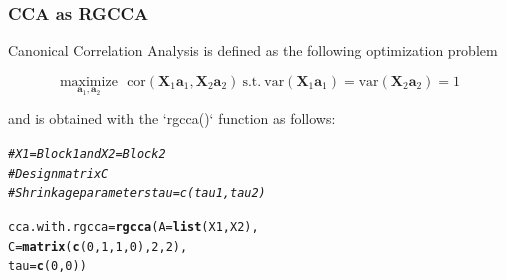 \documentclass[10pt,xcolor=dvipsnames]{beamer}\usepackage[]{graphicx}\usepackage[]{color}
\makeatletter
\newcommand{\hlnum}[1]{\textcolor[rgb]{0.686,0.059,0.569}{#1}}%
\newcommand{\hlcom}[1]{\textcolor[rgb]{0.678,0.584,0.686}{\textit{#1}}}%
\newcommand{\hlstd}[1]{\textcolor[rgb]{0.345,0.345,0.345}{#1}}%
\newcommand{\hlkwb}[1]{\textcolor[rgb]{0.69,0.353,0.396}{#1}}%
\newcommand{\hlkwc}[1]{\textcolor[rgb]{0.333,0.667,0.333}{#1}}%
\newcommand{\hlkwd}[1]{\textcolor[rgb]{0.737,0.353,0.396}{\textbf{#1}}}%
\newenvironment{kframe}{%
 \def\at@end@of@kframe{}%
 \ifinner\ifhmode%
  \def\at@end@of@kframe{\end{minipage}}%
  \begin{minipage}{\columnwidth}%
 \fi\fi%
 \def\FrameCommand##1{\hskip\@totalleftmargin \hskip-\fboxsep
 \colorbox{shadecolor}{##1}\hskip-\fboxsep
     \hskip-\linewidth \hskip-\@totalleftmargin \hskip\columnwidth}%
 \MakeFramed {\advance\hsize-\width
   \@totalleftmargin\z@ \linewidth\hsize
   \@setminipage}}%
 {\par\unskip\endMakeFramed%
 \at@end@of@kframe}
\newenvironment{knitrout}{}{} %
\newcommand{\X}{\mathbf{X}}
\newcommand{\ma}[1]{\ensuremath{\mathbf{#1}}}
\makeatother
\begin{document}
\begin{frame}\frametitle{CCA as RGCCA}

Canonical Correlation Analysis is defined as the following optimization problem 

\begin{equation*}
\underset{\ma a_1, \ma a_2}{\text{maximize}} \text{
~~cor}\left(\X_1\ma a_1, \X_2\ma a_2 \right) \mathrm{~s.t.~} \text{var}(\X_1\ma a_1) = \text{var}(\X_2\ma a_2) = 1
\label{CCA}
\end{equation*}

and is obtained with the `rgcca()` function as follows:


\begin{knitrout}\footnotesize
{}\color{fgcolor}\begin{kframe}
\begin{alltt}
\hlcom{# X1 = Block1 and X2 = Block2 }
\hlcom{# Design matrix C}
\hlcom{# Shrinkage parameters tau = c(tau1, tau2)}

\hlstd{cca.with.rgcca} \hlkwb{=} \hlkwd{rgcca}\hlstd{(}\hlkwc{A}\hlstd{=} \hlkwd{list}\hlstd{(X1, X2),}
                       \hlkwc{C} \hlstd{=} \hlkwd{matrix}\hlstd{(}\hlkwd{c}\hlstd{(}\hlnum{0}\hlstd{,} \hlnum{1}\hlstd{,} \hlnum{1}\hlstd{,} \hlnum{0}\hlstd{),} \hlnum{2}\hlstd{,} \hlnum{2}\hlstd{),}
                       \hlkwc{tau} \hlstd{=} \hlkwd{c}\hlstd{(}\hlnum{0}\hlstd{,} \hlnum{0}\hlstd{))}
\end{alltt}
\end{kframe}
\end{knitrout}

\end{frame}
\end{document}
